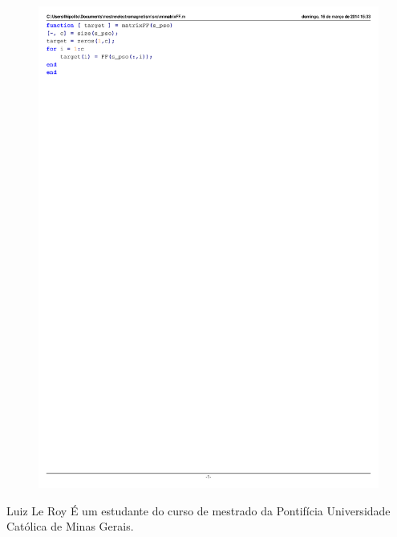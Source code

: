 \documentclass{IEEEtran}
\begin{document}
\begin{figure}
	\centering
	\includegraphics{matrixFF.pdf}
	\label{matrixFF}
\end{figure}


\ifCLASSOPTIONcaptionsoff
  \newpage
\fi




\begin{IEEEbiographynophoto}{Luiz Le Roy}
\'E um estudante do curso de mestrado da Pontif\'icia Universidade Cat\'olica de Minas Gerais.
\end{IEEEbiographynophoto}

\end{document}
